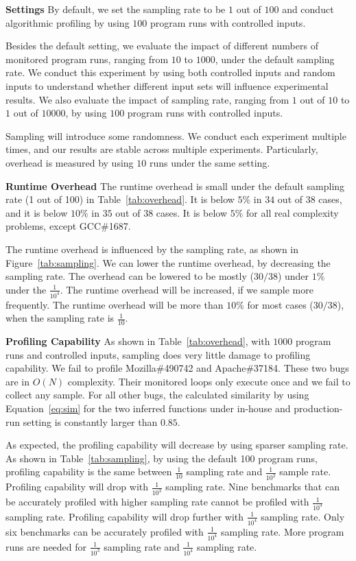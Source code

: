 \noindent\textbf{Settings}
By default, we set the sampling rate to be $1$ out of $100$ 
and conduct algorithmic profiling by using $100$ program runs with controlled inputs.  

Besides the default setting,
we evaluate the impact of different numbers of monitored program runs, 
ranging from $10$ to $1000$, under the default sampling rate.
We conduct this experiment by using both controlled inputs and random inputs 
to understand whether different input sets will influence experimental results.
We also evaluate the impact of sampling rate, ranging from $1$ out of $10$ to $1$ out of $10000$, 
by using $100$ program runs with controlled inputs.  

Sampling will introduce some randomness. 
We conduct each experiment multiple times, 
and our results are stable across multiple experiments. 
Particularly, overhead is measured by using $10$ runs under the same setting. 

\noindent\textbf{Runtime Overhead}
The runtime overhead is small under the default sampling rate (1 out of 100) 
in Table~\ref{tab:overhead}.
It is below $5\%$ in $34$ out of $38$ cases, 
and it is below $10\%$ in $35$ out of $38$ cases. 
It is below $5\%$ for all real complexity problems, 
except GCC\#1687. 

The runtime overhead is influenced by the sampling rate, 
as shown in Figure~\ref{tab:sampling}.
We can lower the runtime overhead, by decreasing the sampling rate.
The overhead can be lowered to be mostly ($30/38$) 
under $1\%$ under the $\frac{1}{10^4}$.
The runtime overhead will be increased, 
if we sample more frequently.
The runtime overhead will be more than $10\%$ for most cases ($30/38$), 
when the sampling rate is $\frac{1}{10}$.

\noindent\textbf{Profiling Capability}
As shown in Table~\ref{tab:overhead}, 
with $1000$ program runs and controlled inputs, 
sampling does very little damage to profiling capability. 
We fail to profile Mozilla\#490742 and Apache\#37184.
These two bugs are in $O(N)$ complexity. 
Their monitored loops only execute once 
and we fail to collect any sample.
For all other bugs, 
the calculated similarity by using Equation~\ref{eq:sim}
for the two inferred functions under 
in-house and production-run setting
is constantly larger than $0.85$.

As expected, the profiling capability will decrease by using sparser sampling rate. 
As shown in Table~\ref{tab:sampling}, 
by using the default 100 program runs,
profiling capability is the same between $\frac{1}{10}$ sampling rate 
and $\frac{1}{10^2}$ sample rate.
Profiling capability will drop with $\frac{1}{10^3}$ sampling rate. 
Nine benchmarks that can be accurately profiled with higher sampling rate
cannot be profiled with $\frac{1}{10^3}$ sampling rate.
Profiling capability will drop further with $\frac{1}{10^4}$ sampling rate. 
Only six benchmarks can be accurately profiled with $\frac{1}{10^4}$ sampling rate. 
More program runs are needed for $\frac{1}{10^3}$ sampling rate 
and $\frac{1}{10^4}$ sampling rate. 

